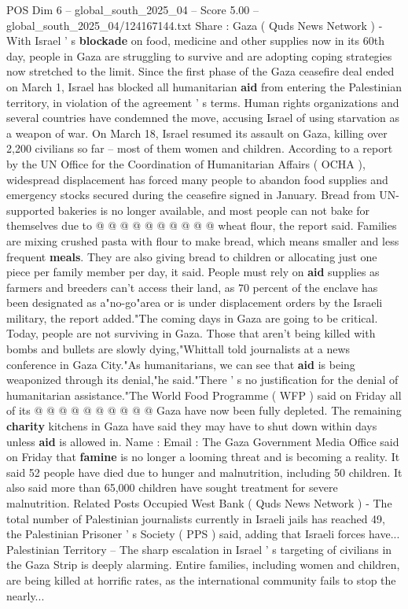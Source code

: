 \begin{textsample}{POS Dim 6 – global\_south\_2025\_04 – Score 5.00 – global\_south\_2025\_04/124167144.txt}  \label{ex:f6_pos_231}
Share : Gaza ( Quds News Network ) - With Israel ' s \textbf{blockade} on food, medicine and other supplies now in its 60th day, people in Gaza are struggling to survive and are adopting coping strategies now stretched to the limit.
Since the first phase of the Gaza ceasefire deal ended on March 1, Israel has blocked all humanitarian \textbf{aid} from entering the Palestinian territory, in violation of the agreement ' s terms.
Human rights organizations and several countries have condemned the move, accusing Israel of using starvation as a weapon of war.
On March 18, Israel resumed its assault on Gaza, killing over 2,200 civilians so far -- most of them women and children.
According to a report by the UN Office for the Coordination of Humanitarian Affairs ( OCHA ), widespread displacement has forced many people to abandon food supplies and emergency stocks secured during the ceasefire signed in January.
Bread from UN-supported bakeries is no longer available, and most people can not bake for themselves due to @ @ @ @ @ @ @ @ @ @ wheat flour, the report said.
Families are mixing crushed pasta with flour to make bread, which means smaller and less frequent \textbf{meals}.
They are also giving bread to children or allocating just one piece per family member per day, it said.
People must rely on \textbf{aid} supplies as farmers and breeders can't access their land, as 70 percent of the enclave has been designated as a"no-go"area or is under displacement orders by the Israeli military, the report added."The coming days in Gaza are going to be critical.
Today, people are not surviving in Gaza.
Those that aren't being killed with bombs and bullets are slowly dying,"Whittall told journalists at a news conference in Gaza City."As humanitarians, we can see that \textbf{aid} is being weaponized through its denial,"he said."There ' s no justification for the denial of humanitarian assistance."The World Food Programme ( WFP ) said on Friday all of its @ @ @ @ @ @ @ @ @ @ Gaza have now been fully depleted.
The remaining \textbf{charity} kitchens in Gaza have said they may have to shut down within days unless \textbf{aid} is allowed in.
Name : Email : The Gaza Government Media Office said on Friday that \textbf{famine} is no longer a looming threat and is becoming a reality.
It said 52 people have died due to hunger and malnutrition, including 50 children.
It also said more than 65,000 children have sought treatment for severe malnutrition.
Related Posts Occupied West Bank ( Quds News Network ) - The total number of Palestinian journalists currently in Israeli jails has reached 49, the Palestinian Prisoner ' s Society ( PPS ) said, adding that Israeli forces have...
Palestinian Territory -- The sharp escalation in Israel ' s targeting of civilians in the Gaza Strip is deeply alarming.
Entire families, including women and children, are being killed at horrific rates, as the international community fails to stop the nearly...

\end{textsample}
